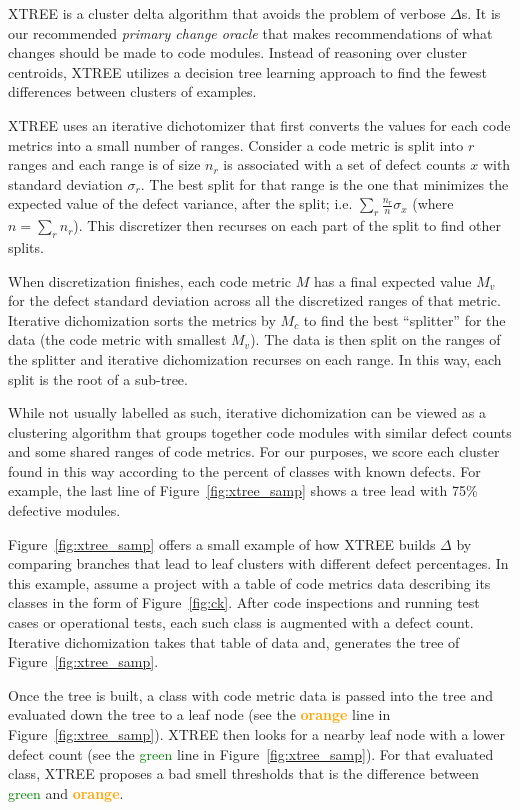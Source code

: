 \documentclass[twocolumn,5p]{elsarticle}
\newcommand{\fig}[1]{Figure~\ref{fig:#1}}
\theoremstyle{break}
\begin{document}
  XTREE  is a cluster delta algorithm
  that avoids the problem of verbose $\Delta$s.
  It is our recommended {\em primary change oracle} that makes recommendations 
  of what changes should be made to code modules.
  Instead of reasoning over cluster centroids,
  XTREE utilizes a decision tree learning approach
  to find the fewest differences between clusters of examples.
  
  
 XTREE uses an iterative dichotomizer that
first converts the values for each code
metrics into a small number of ranges.
Consider a code metric is split into $r$ ranges and each range is of
  size
    $n_r$ is
  associated with a set of defect counts $x$ with standard deviation
  $\sigma_r$.
  The best split for that range is
  the one that minimizes the expected value of the
  defect variance, after the split; i.e.
  $\sum_r\frac{n_r}{n}\sigma_x$ (where $n=\sum_r n_r$).
  This discretizer then recurses on each part of the split
  to find other splits. 
  
  When discretization finishes, each code metric $M$ has a 
  final expected value $M_v$ for the defect standard deviation 
  across all the discretized ranges of that metric.
  Iterative dichomization sorts the metrics by $M_c$
  to find the best ``splitter'' for the data
  (the code metric with smallest $M_v$). The data
  is then split on the ranges of the splitter and
  iterative dichomization recurses on each range.  In this way,
  each split is the root of a sub-tree.

 
  While not usually labelled as such, iterative dichomization can
  be viewed as a clustering algorithm that groups together code modules
  with similar defect counts and some shared ranges of code metrics.
  For our purposes, we score each cluster found in this way according
  to the percent of classes with known defects. For example,
  the last line of \fig{xtree_samp} shows a tree lead with 75\%
  defective modules.
  
 \fig{xtree_samp} offers
  a small example of how XTREE builds
    $\Delta$ by comparing branches that lead to leaf clusters
  with different defect percentages. In this example, assume a project with a table of code metrics data describing its classes in the form of \fig{ck}. After code inspections and running test cases or operational
      tests, each such class is augmented with a defect count.
      Iterative dichomization takes that table of data and, 
        generates the tree of \fig{xtree_samp}.
        
     Once the tree is built, a class with code metric data is passed into the tree and evaluated down the tree to a leaf node (see the \textcolor{orange}{{\bf orange}} line in \fig{xtree_samp}).
      XTREE then looks for a nearby leaf node with a lower defect
      count (see the \textcolor{green}{{green}} line in \fig{xtree_samp}). For that evaluated class, XTREE proposes a bad smell
      thresholds that is  the difference between 
      \textcolor{green}{{green}} and \textcolor{orange}{{\bf orange}}. 
  
\end{document}
